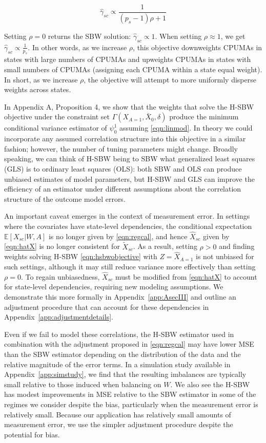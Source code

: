 \documentclass[aoas]{imsart}
\theoremstyle{plain}
\theoremstyle{remark}
\begin{document}
\begin{equation}\label{eqn:sbwsol}
\hat{\gamma}_{sc} \propto \frac{1}{(p_s - 1)\rho + 1}
\end{equation}

Setting $\rho = 0$ returns the SBW solution: $\hat{\gamma}_{sc} \propto 1$. When setting $\rho \approx 1$, we get $\hat{\gamma}_{sc} \propto \frac{1}{p_s}$. In other words, as we increase $\rho$, this objective downweights CPUMAs in states with large numbers of CPUMAs and upweights CPUMAs in states with small numbers of CPUMAs (assigning each CPUMA within a state equal weight). In short, as we increase $\rho$, the objective will attempt to more uniformly disperse weights across states. 

In Appendix A, Proposition 4, we show that the weights that solve the H-SBW objective under the constraint set $\Gamma(X_{A=1}, \bar{X}_0, \delta)$ produce the minimum conditional variance estimator of $\psi_0^1$ assuming \eqref{eqn:linmod}. In theory we could incorporate any assumed correlation structure into this objective in a similar fashion; however, the number of tuning parameters might change. Broadly speaking, we can think of H-SBW being to SBW what generalized least squares (GLS) is to ordinary least squares (OLS): both SBW and OLS can produce unbiased estimates of model parameters, but H-SBW and GLS can improve the efficiency of an estimator under different assumptions about the correlation structure of the outcome model errors. 

An important caveat emerges in the context of measurement error. In settings where the covariates have state-level dependencies, the conditional expectation $\mathbb{E}[X_{sc}|W,A]$ is no longer given by \eqref{eqn:regcal}, and hence $\hat{X}_{sc}$ given by \eqref{eqn:hatX} is no longer consistent for $\tilde{X}_{sc}$. As a result, setting $\rho > 0$ and finding weights solving H-SBW \eqref{eqn:hsbwobjective} with $Z = \hat{X}_{A=1}$ is not unbiased for such settings, although it may still reduce variance more effectively than setting $\rho=0$. To regain unbiasedness, $\hat{X}_{sc}$ must be modified from \eqref{eqn:hatX} to account for state-level dependencies, requiring new modeling assumptions. We demonstrate this more formally in Appendix~\ref{app:AsecIII} and outline an adjustment procedure that can account for these dependencies in Appendix~\ref{app:adjustmentdetails}.

Even if we fail to model these correlations, the H-SBW estimator used in combination with the adjustment proposed in \eqref{eqn:regcal} may have lower MSE than the SBW estimator depending on the distribution of the data and the relative magnitude of the error terms. In a simulation study available in Appendix~\ref{app:simstudy}, we find that the resulting imbalances are typically small relative to those induced when balancing on $W$. We also see the H-SBW has modest improvements in MSE relative to the SBW estimator in some of the regimes we consider despite the bias, particularly when the measurement error is relatively small. Because our application has relatively small amounts of measurement error, we use the simpler adjustment procedure despite the potential for bias.
\end{document}

